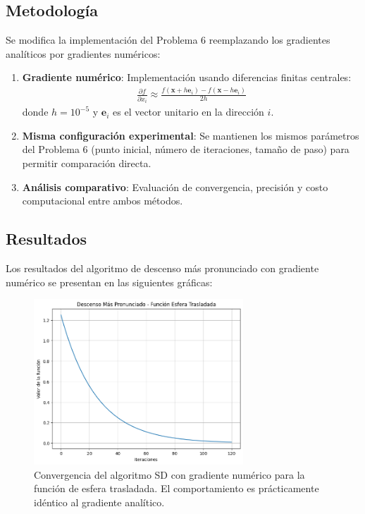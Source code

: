 \documentclass{article}
\begin{document}
\subsection{Metodología}

Se modifica la implementación del Problema 6 reemplazando los gradientes analíticos por gradientes numéricos:

\begin{enumerate}
    \item \textbf{Gradiente numérico}: Implementación usando diferencias finitas centrales:
    \begin{align}
    \frac{\partial f}{\partial x_i} \approx \frac{f(\mathbf{x} + h\mathbf{e}_i) - f(\mathbf{x} - h\mathbf{e}_i)}{2h}
    \end{align}
    donde $h = 10^{-5}$ y $\mathbf{e}_i$ es el vector unitario en la dirección $i$.
    
    \item \textbf{Misma configuración experimental}: Se mantienen los mismos parámetros del Problema 6 (punto inicial, número de iteraciones, tamaño de paso) para permitir comparación directa.
    
    \item \textbf{Análisis comparativo}: Evaluación de convergencia, precisión y costo computacional entre ambos métodos.
\end{enumerate}

\subsection{Resultados}
\setcounter{equation}{0}

Los resultados del algoritmo de descenso más pronunciado con gradiente numérico se presentan en las siguientes gráficas:

\begin{figure}[H]
\centering
\includegraphics[width=0.7\textwidth]{images/7_sphere.png}
\caption{Convergencia del algoritmo SD con gradiente numérico para la función de esfera trasladada. El comportamiento es prácticamente idéntico al gradiente analítico.}
\label{fig:sd_numerical_sphere}
\end{figure}
\end{document}
